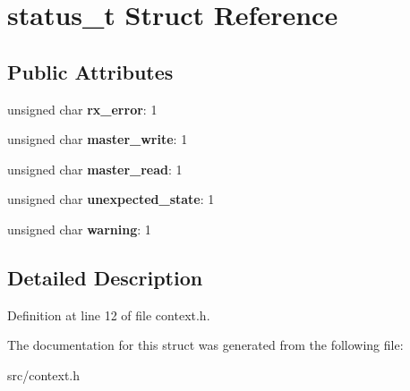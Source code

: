 \hypertarget{structstatus__t}{\section{status\-\_\-t Struct Reference}
\label{structstatus__t}
}
\subsection*{Public Attributes}
\begin{DoxyCompactItemize}
\item 
\hypertarget{structstatus__t_a05b4fada97158d7782b74b89761f802e}{unsigned char {\bfseries rx\-\_\-error}\-: 1}\label{structstatus__t_a05b4fada97158d7782b74b89761f802e}

\item 
\hypertarget{structstatus__t_a26afaab7b173abb25ef5546fdcf116a8}{unsigned char {\bfseries master\-\_\-write}\-: 1}\label{structstatus__t_a26afaab7b173abb25ef5546fdcf116a8}

\item 
\hypertarget{structstatus__t_a553cbc2843d8456e899f4a2b9ed7e7e2}{unsigned char {\bfseries master\-\_\-read}\-: 1}\label{structstatus__t_a553cbc2843d8456e899f4a2b9ed7e7e2}

\item 
\hypertarget{structstatus__t_a5093c9c2b8c9b89eaa42b71edb58b1f4}{unsigned char {\bfseries unexpected\-\_\-state}\-: 1}\label{structstatus__t_a5093c9c2b8c9b89eaa42b71edb58b1f4}

\item 
\hypertarget{structstatus__t_a2fbf2dc7cfe9e06e2bc33706e3ab6593}{unsigned char {\bfseries warning}\-: 1}\label{structstatus__t_a2fbf2dc7cfe9e06e2bc33706e3ab6593}

\end{DoxyCompactItemize}


\subsection{Detailed Description}


Definition at line 12 of file context.\-h.



The documentation for this struct was generated from the following file\-:\begin{DoxyCompactItemize}
\item 
src/context.\-h\end{DoxyCompactItemize}
